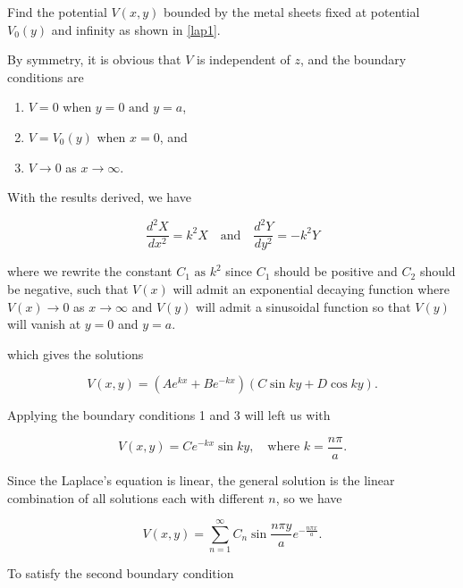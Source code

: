 \documentclass[english,a4paper,12pt]{report}
\begin{document}
{Find the potential \(V(x,y)\) bounded by the metal sheets fixed at potential \(V_0 (y)\) and infinity as shown in \cref{lap1}.}
{By symmetry, it is obvious that \(V\) is independent of \(z\), and the boundary conditions are
            
\begin{enumerate}[itemsep=10pt] 
    \item \(V = 0\) when \(y = 0 \text { and }  y = a\),
    \item \(V = V_0(y)\) when \(x = 0\), and
    \item \(V \rightarrow  0\) as \(x \rightarrow  \infty\).
\end{enumerate}

With the results derived, we have

\begin{equation}
    \frac{d^2X}{dx^2} = k^2X ~~~ \text{ and } ~~~ \frac{d^2Y}{dy^2} = -k^2Y
\end{equation}

where we rewrite the constant \(C_1 \text{ as } k^2\) since \(C_1\) should be positive and  \(C_2\) should be negative, such that \(V(x)\) will admit an exponential decaying function where \(V(x) \rightarrow 0\) as \(x \rightarrow \infty\) and \(V(y)\) will admit a sinusoidal function so that \(V(y)\) will vanish at \(y = 0\) and \(y = a\).            

which gives the solutions

\begin{equation}
    V(x,y) = (A e^{kx} + B e^{-kx} )(C\sin ky+D\cos ky) .
\end{equation}

Applying the boundary conditions 1 and 3 will left us with 

\begin{equation}
    V(x,y) = C e^{-kx} \sin ky, ~~~ \text{ where } k = \frac{n\pi }{a}. 
\end{equation}

Since the Laplace's equation is linear, the general solution is the linear combination of all solutions each with different \(n\), so we have 

\begin{equation}
    V(x,y) = \sum_{n=1}^{\infty} C_{n} \sin \frac{n\pi y}{a} e^{-\frac{n\pi x}{a}} .
\end{equation}

To satisfy the second boundary condition

}
\end{document}
